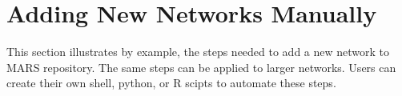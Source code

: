 \section{Adding New Networks Manually}
This section illustrates by example, the steps needed to add a new network to MARS repository. The same steps can be applied to larger networks. Users can create their own shell, python, or R scipts to automate these steps.
